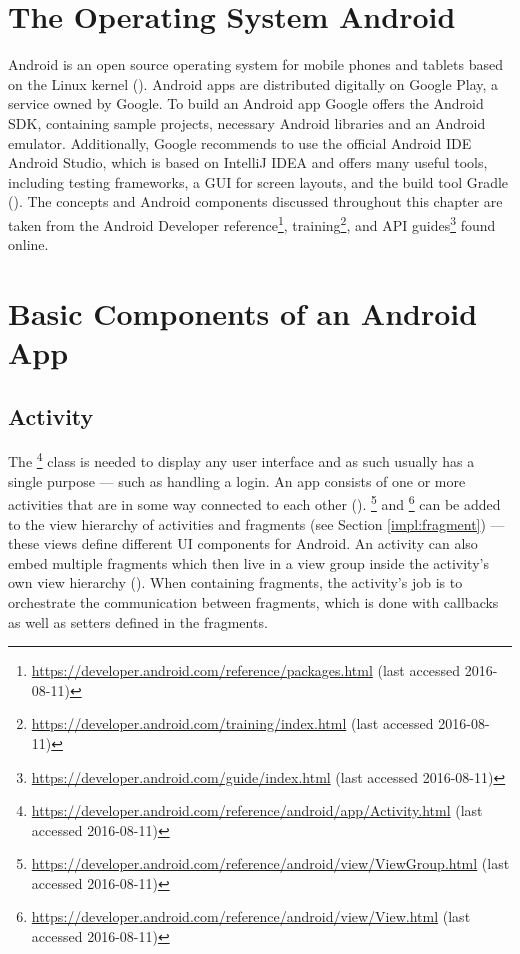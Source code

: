 \section{The Operating System Android}
Android is an open source operating system for mobile phones and tablets based on the Linux kernel (\cite{androiddef}). Android apps are distributed digitally on Google Play, a service owned by Google. To build an Android app Google offers the Android \gls{SDK}, containing sample projects, necessary Android libraries and an Android emulator. Additionally, Google recommends to use the official Android \gls{IDE} Android Studio, which is based on IntelliJ IDEA and offers many useful tools, including testing frameworks, a \gls{GUI} for screen layouts, and the build tool Gradle (\cite{androidstudio}). The concepts and Android components discussed throughout this chapter are taken from the Android Developer reference\footnote{\url{https://developer.android.com/reference/packages.html} (last accessed 2016-08-11)}, training\footnote{\url{https://developer.android.com/training/index.html} (last accessed 2016-08-11)}, and \gls{API} guides\footnote{\url{https://developer.android.com/guide/index.html} (last accessed 2016-08-11)} found online.

\section{Basic Components of an Android App}

\subsection{Activity}
The \footnote{\url{https://developer.android.com/reference/android/app/Activity.html} (last accessed 2016-08-11)} class is needed to display any user interface and as such usually has a single purpose --- such as handling a login. An app consists of one or more activities that are in some way connected to each other (\cite{activities_in_app}). \footnote{\url{https://developer.android.com/reference/android/view/ViewGroup.html} (last accessed 2016-08-11)} and \footnote{\url{https://developer.android.com/reference/android/view/View.html} (last accessed 2016-08-11)} can be added to the view hierarchy of activities and fragments (see Section \ref{impl:fragment}) --- these views define different UI components for Android. An activity can also embed multiple fragments which then live in a view group inside the activity's own view hierarchy (\cite{androidfragment}). When containing fragments, the activity’s job is to orchestrate the communication between fragments, which is done with callbacks as well as setters defined in the fragments. 

